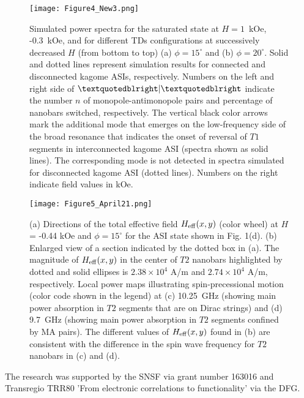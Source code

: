 \documentclass[aps,prl,preprint,showpacs,superscriptaddress,groupedaddress]{revtex4}%
\begin{document}
   \begin{figure}	
   	\texttt{[image: Figure4\_New3.png]}
   	\begin{flushleft}
   		\caption{ Simulated power spectra for the saturated state at $H=1$~kOe, -0.3~kOe, and for different TDs configurations at successively decreased $H$ (from bottom to top) (a) $\phi=15^{\circ}$  and (b) $\phi=20^{\circ}$. Solid and dotted lines represent simulation results for connected and disconnected kagome ASIs, respectively.  Numbers on the left and right side of $\textquotedblright |\textquotedblright$ indicate the number $n$ of monopole-antimonopole pairs and percentage of nanobars switched, respectively. The vertical black color arrows mark the additional mode that emerges on the low-frequency side of the broad resonance that indicates the onset of reversal of $T1$ segments in interconnected kagome ASI (spectra shown as solid lines). The corresponding mode is not detected in spectra simulated for disconnected kagome ASI (dotted lines). Numbers on the right indicate field values in kOe. }
   	\end{flushleft}
   \end{figure}
   \begin{figure}
   	\texttt{[image: Figure5\_April21.png]}
   	\begin{flushleft}
   		\caption{(a) Directions of the total effective field $ H_{\rm eff} (x,y) $ (color wheel) at $ H $ = -0.44 kOe and  $\phi=15^{\circ}$  for the ASI state shown in Fig. 1(d). (b) Enlarged view of a section indicated by the dotted box in (a). The magnitude of $ H_{\rm eff}(x,y) $  in the center of  $T2$ nanobars highlighted by dotted and solid ellipses is $ 2.38 \times 10^{4} $ A/m and $ 2.74 \times 10^{4} $ A/m, respectively.   Local power maps illustrating spin-precessional motion (color code shown in the legend) at (c) 10.25~GHz (showing main power absorption in  $T2$ segments that are on Dirac strings) and (d) 9.7~GHz (showing main power absorption in $T2$ segments confined by MA pairs).  The different values of $ H_{\rm eff} (x,y) $  found in (b) are consistent with the difference in the spin wave frequency for $T2$ nanobars in (c) and (d).      }
   	\end{flushleft}
   \end{figure}
\indent  The research was supported by the SNSF via grant number 163016 and Transregio TRR80 'From electronic correlations to functionality' via the DFG.
 
\end{document}
